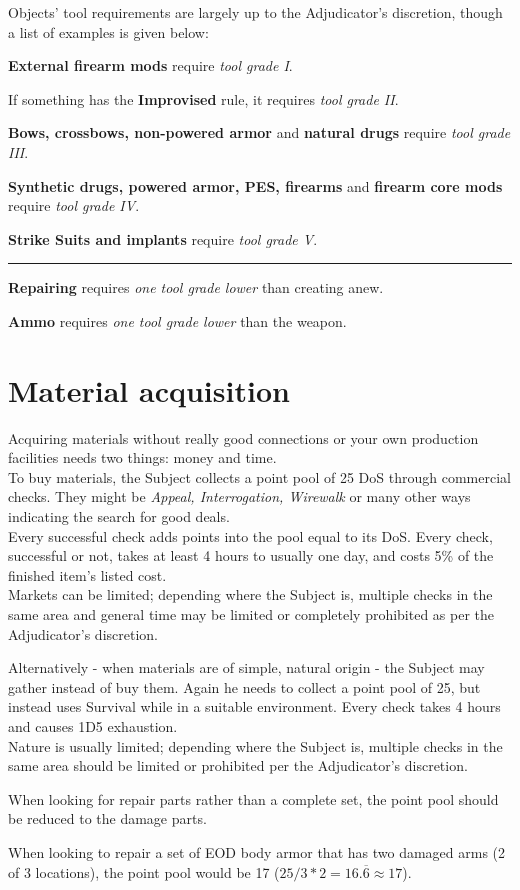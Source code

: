\documentclass[12pt,a4paper,openany,usenames,dvipsnames]{book}
\begin{document}
	Objects’ tool requirements are largely up to the Adjudicator's discretion, though a list of examples is given below:
	\begin{sitemize}[8]
		\item \textbf{External firearm mods} require \emph{tool grade I}.
		\item If something has the \textbf{Improvised} rule, it requires \emph{tool grade II}.
		\item \textbf{Bows, crossbows, non-powered armor} and \textbf{natural drugs} require \emph{tool grade III}.
		\item \textbf{Synthetic drugs, powered armor, PES, firearms} and \textbf{firearm core mods} require \emph{tool grade IV}.
		\item \textbf{Strike Suits and implants} require \emph{tool grade V}.
		\hrule
		\item \textbf{Repairing} requires \emph{one tool grade lower} than creating anew.
		\item \textbf{Ammo} requires \emph{one tool grade lower} than the weapon.
	\end{sitemize}

	\chapter{Material acquisition}
	Acquiring materials without really good connections or your own production facilities needs two things: money and time.\\
	To buy materials, the Subject collects a point pool of 25 DoS through commercial checks.
	They might be \emph{Appeal, Interrogation, Wirewalk} or many other ways indicating the search for good deals.
	\\%
	Every successful check adds points into the pool equal to its DoS.
	Every check, successful or not,
		takes at least 4 hours to usually one day,
		and costs 5\% of the finished item’s listed cost.\\
	Markets can be limited;
		depending where the Subject is,
		multiple checks in the same area and general time
		may be limited or completely prohibited as per the Adjudicator's discretion. \par
	Alternatively - when materials are of simple, natural origin - the Subject may gather instead of buy them.
	Again he needs to collect a point pool of 25,
		but instead uses Survival while in a suitable environment.
	Every check takes 4 hours and causes 1D5 exhaustion.\\
	Nature is usually limited; depending where the Subject is,
		multiple checks in the same area should be limited or prohibited per the Adjudicator's discretion.
	\par
	When looking for repair parts rather than a complete set,
	the point pool should be reduced to the damage parts.
	\begin{exampleblock}
		When looking to repair a set of EOD body armor
		that has two damaged arms (2 of 3 locations),
		the point pool would be 17 ($25 / 3 * 2 = 16.\overline{6} \approx 17$).
	\end{exampleblock}
\end{document}

